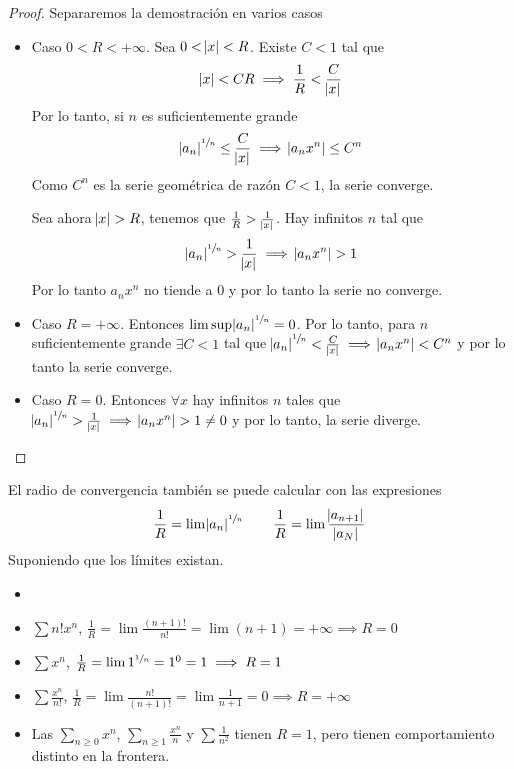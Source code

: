 \begin{proof}
	Separaremos la demostración en varios casos
	\begin{itemize}
		\item Caso $0 < R < + \infty$. Sea $0 < \abs{x} < R$. Existe $C < 1$ tal que
		 	\[
				\abs{x} < CR \implies \frac{1}{R} < \frac{C}{\abs{x}}
			\]
			Por lo tanto, si $n$ es suficientemente grande
			\[
				\abs{a_n}^{\sfrac{1}{n}} \leq \frac{C}{\abs{x}} \implies
				\abs{a_nx^n} \leq C^n
			\]
			Como $C^n$ es la serie geométrica de razón $C < 1$, la serie converge.

			Sea ahora $\abs{x} > R$, tenemos que $\frac{1}{R} > \frac{1}{\abs{x}}$.
			Hay infinitos $n$ tal que
			\[
				\abs{a_n}^{\sfrac{1}{n}} > \frac{1}{\abs{x}} \implies \abs{a_nx^n} > 1
			\]
			Por lo tanto $a_nx^n$ no tiende a 0 y por lo tanto la serie no converge.
		\item Caso $R = +\infty$. Entonces $\limsup \abs{a_n}^{\sfrac{1}{n}} = 0$.
			Por lo tanto, para $n$ suficientemente grande $\exists C < 1$ tal que
			$\abs{a_n}^{\sfrac{1}{n}} < \frac{C}{\abs{x}} \implies \abs{a_nx^n} < C^n$ y por lo tanto
			la serie converge.
		\item Caso $R = 0$. Entonces $\forall x$ hay infinitos $n$ tales que
		 	$\abs{a_n}^{\sfrac{1}{n}} > \frac{1}{\abs{x}} \implies \abs{a_nx^n} > 1 \neq 0$
			y por lo tanto, la serie diverge.
	\end{itemize}
\end{proof}

\begin{obs}
	El radio de convergencia también se puede calcular con las expresiones
	\[
		\frac{1}{R} = \lim \abs{a_n}^{\sfrac{1}{n}} \qquad
		\frac{1}{R} = \lim \frac{\abs{a_{n+1}}}{\abs{a_N}}
	\]
	Suponiendo que los límites existan.
\end{obs}

\begin{example*}
	\begin{itemize}
		\item[]
		\item $\sum n!x^n$, $\frac{1}{R} = \lim \frac{(n+1)!}{n!} = \lim (n+1)
			= +\infty \implies R = 0$
		\item $\sum x^n$, $\frac{1}{R} = \lim 1^{\sfrac{1}{n}} = 1^0 = 1 \implies
			R = 1$
		\item $\sum \frac{x^n}{n!}$, $\frac{1}{R} = \lim \frac{n!}{(n+1)!} =
			\lim \frac{1}{n+1} = 0 \implies R = +\infty$
		\item Las $\sum\limits_{n \geq 0} x^n$, $\sum\limits_{n \geq 1} \frac{x^n}{n}$
			y $\sum \frac{1}{n^2}$ tienen $R = 1$, pero tienen comportamiento
			distinto en la frontera.
	\end{itemize}
\end{example*}

